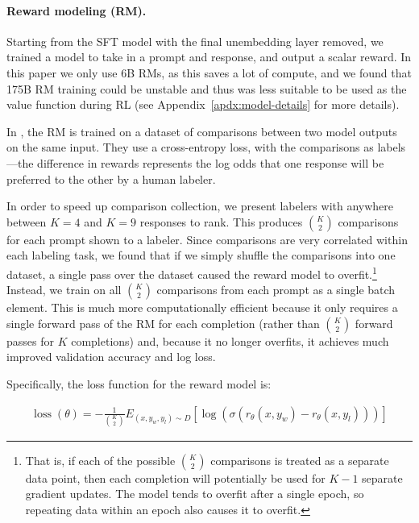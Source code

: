 \paragraph{Reward modeling (RM).} Starting from the SFT model with the final unembedding layer removed, we trained a model to take in a prompt and response, and output a scalar reward. In this paper we only use 6B RMs, as this saves a lot of compute, and we found that 175B RM training could be unstable and thus was less suitable to be used as the value function during RL (see Appendix~\ref{apdx:model-details} for more details). 

In \citet{stiennon2020learning}, the RM is trained on a dataset of comparisons between two model outputs on the same input. They use a cross-entropy loss, with the comparisons as labels---the difference in rewards represents the log odds that one response will be preferred to the other by a human labeler.  

In order to speed up comparison collection, we present labelers with anywhere between $K=4$ and $K=9$ responses to rank.  This produces ${K \choose 2}$ comparisons for each prompt shown to a labeler.  Since comparisons are very correlated within each labeling task, we found that if we simply shuffle the comparisons into one dataset, a single pass over the dataset caused the reward model to overfit.\footnote{That is, if each of the possible ${K \choose 2}$ comparisons is treated as a separate data point, then each completion will potentially be used for $K-1$ separate gradient updates. The model tends to overfit after a single epoch, so repeating data within an epoch also causes it to overfit.} Instead, we train on all ${K \choose 2}$ comparisons from each prompt as a single batch element.  This is much more computationally efficient because it only requires a single forward pass of the RM for each completion (rather than ${K \choose 2}$ forward passes for $K$ completions) and, because it no longer overfits, it achieves much improved validation accuracy and log loss.

Specifically, the loss function for the reward model is:

\begin{equation} \label{eq1}
\begin{split}
\operatorname{loss}\left(\theta \right)=-\frac{1}{{K \choose 2}}E_{\left(x, y_{w}, y_{l}\right) \sim D}\left[\log \left(\sigma\left(r_{\theta}\left(x, y_{w}\right)-r_{\theta}\left(x, y_{l}\right)\right)\right)\right]
\end{split}
\end{equation}

